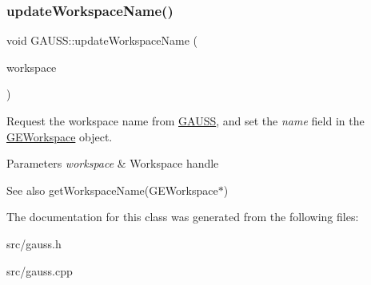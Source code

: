\subsubsection{\texorpdfstring{update\+Workspace\+Name()}{updateWorkspaceName()}}
{\footnotesize\ttfamily void G\+A\+U\+S\+S\+::update\+Workspace\+Name (\begin{DoxyParamCaption}\item[{\hyperlink{class_g_e_workspace}{G\+E\+Workspace} $\ast$}]{workspace }\end{DoxyParamCaption})}



Request the workspace name from \hyperlink{class_g_a_u_s_s}{G\+A\+U\+SS}, and set the {\itshape name} field in the \hyperlink{class_g_e_workspace}{G\+E\+Workspace} object. 


\begin{DoxyParams}{Parameters}
{\em workspace} & Workspace handle\\
\hline
\end{DoxyParams}
\begin{DoxySeeAlso}{See also}
get\+Workspace\+Name(\+G\+E\+Workspace$\ast$) 
\end{DoxySeeAlso}


The documentation for this class was generated from the following files\+:\begin{DoxyCompactItemize}
\item 
src/gauss.\+h\item 
src/gauss.\+cpp\end{DoxyCompactItemize}
